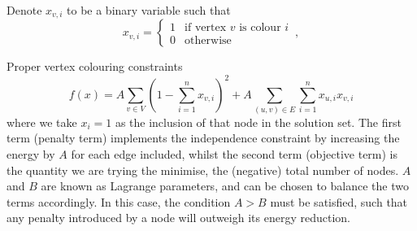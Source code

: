 \documentclass[12pt]{article}
\begin{document}
Denote $x_{v,i}$ to be a binary variable such that
\begin{equation}
    x_{v,i} =
    \begin{cases}
        1 & \text{if vertex $v$ is colour $i$} \\
        0 & \text{otherwise}
    \end{cases}
    \,,
\end{equation}

Proper vertex colouring constraints
\begin{equation}
    f(x)=A\sum_{v \in V}\left(1-\sum_{i=1}^{n} x_{v,i}\right)^2+A\sum_{(u,v) \in E}\sum_{i=1}^n x_{u,i}x_{v,i}
    \label{eq:MIS}
\end{equation}
where we take $x_i=1$ as the inclusion of that node in the solution set. The first term (penalty term) implements the independence constraint by increasing the energy by $A$ for each edge included, whilst the second term (objective term) is the quantity we are trying the minimise, the (negative) total number of nodes. $A$ and $B$ are known as Lagrange parameters, and can be chosen to balance the two terms accordingly. In this case, the condition $A>B$ must be satisfied, such that any penalty introduced by a node will outweigh its energy reduction.
\end{document}
